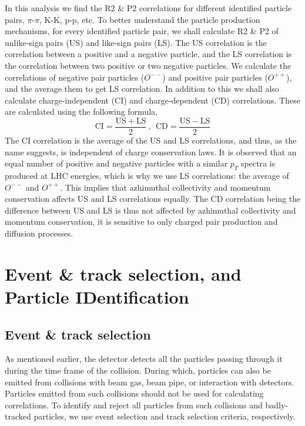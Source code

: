 \documentclass[12pt,a4paper,twoside]{report}
\begin{document}
In this analysis we find the R2 \& P2 correlations for different identified particle pairs, $\pi$-$\pi$, K-K, p-p, etc. To better understand the particle production mechanisms, for every identified particle pair, we shall calculate R2 \& P2 of unlike-sign pairs (US) and like-sign pairs (LS). The US correlation is the correlation between a positive and a negative particle, and the LS correlation is the correlation between two positive or two negative particles. We calculate the correlations of negative pair particles ($O^{--}$) and positive pair particles ($O^{++}$), and the average them to get LS correlation. In addition to this we shall also calculate charge-independent (CI) and charge-dependent (CD) correlations. These are calculated using the following formula,
\begin{equation*}
	\mathrm{CI}=\frac{\mathrm{US}+\mathrm{LS}}{2}\ , \ \ \mathrm{CD}=\frac{\mathrm{US}-\mathrm{LS}}{2}
\end{equation*}
The CI correlation is the average of the US and LS correlations, and thus, as the name suggests, is independent of charge conservation laws. It is observed that an equal number of positive and negative particles with a similar $p_T$ spectra is produced at LHC energies, which is why we use LS correlations: the average of $O^{--}$ and $O^{++}$. This implies that azhimuthal collectivity and momentum conservation affects US and LS correlations equally. The CD correlation being the difference between US and LS is thus not affected by azhimuthal collectivity and momentum conservation, it is sensitive to only charged pair production and diffusion processes.
\chapter{Event \& track selection, and Particle IDentification}\label{Ch:Selections}
\section{Event \& track selection}
As mentioned earlier, the detector detects all the particles passing through it during the time frame of the collision. During which, particles can also be emitted from collisions with beam gas, beam pipe, or interaction with detectors. Particles emitted from such collisions should not be used for calculating correlations. To identify and reject all particles from such collisions and badly-tracked particles, we use event selection and track selection criteria, respectively.\\ 
\end{document}
